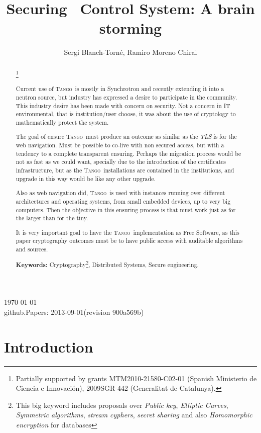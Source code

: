 \documentclass[10pt,a4paper,twoside]{llncs}
\title{Securing \tango\, Control System: A brain storming}
\author{Sergi Blanch-Torn\'e\inst{1}, Ramiro Moreno Chiral\inst{2}}
\institute{
 Escola Polit\`ecnica Superior, Universitat de Lleida. Spain.\\
 \email{\tt sblanch@alumnes.udl.es}
 \and 
 Departament de Matem\`atica. Universitat de Lleida. Spain.\\
 \email{\tt ramiro@matematica.udl.es}
 }
\newcommand{\version}{github.Papers: 2013-09-01\;(revision 900a569b) } %
\newcommand{\tango}{\textsc{Tango}}
\begin{document}
\maketitle
\begin{center}
 \today\\
 \version
\end{center}


\begin{abstract}\footnote{Partially supported by grants MTM2010-21580-C02-01 (Spanish Ministerio de Ciencia e Innovaci\'on), 2009SGR-442 (Generalitat de Catalunya).}

Current use of \tango\, is mostly in Synchrotron and recently extending it into a neutron source, but industry has expressed a desire to participate in the community. This industry desire has been made with concern on security. Not a concern in IT environmental, that is institution/user choose, it was about the use of cryptology to mathematically protect the system.

The goal of ensure \tango\, must produce an outcome as similar as the \emph{TLS} is for the web navigation. Must be possible to co-live with non secured access, but with a tendency to a complete transparent ensuring. Perhaps the migration process would be not as fast as we could want, specially due to the introduction of the certificates infrastructure, but as the \tango\, installations are contained in the institutions, and upgrade in this way would be like any other upgrade.

Also as web navigation did, \tango\, is used with instances running over different architectures and operating systems, from small embedded devices, up to very big computers. Then the objective in this ensuring process is that must work just as for the larger than for the tiny.

It is very important goal to have the \tango\, implementation as Free Software, as this paper cryptography outcomes must be to have public access with auditable algorithms and sources.
   
{\bf Keywords:} Cryptography\footnote{This big keyword includes proposals over \emph{Public key}, \emph{Elliptic Curves}, \emph{Symmetric algorithms}, \emph{stream cyphers}, \emph{secret sharing} and also \emph{Homomorphic encryption} for databases}, Distributed Systems, Secure engineering.

\end{abstract}

%
\section{Introduction \label{sec:introduction}}
\end{document}
